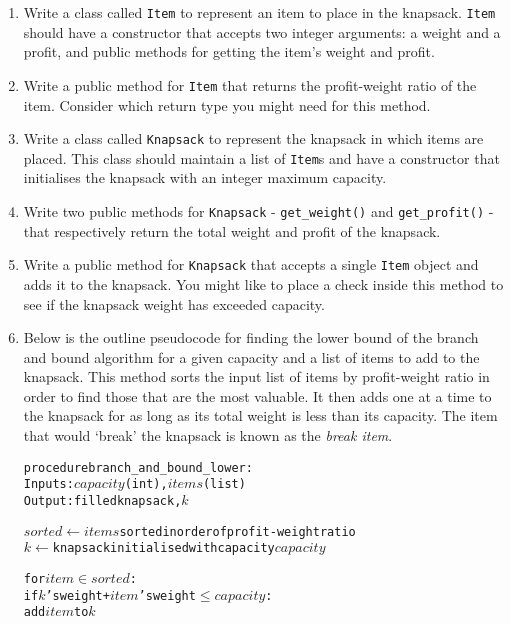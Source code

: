 \documentclass[11pt,a4paper]{report}
\begin{document}
\begin{enumerate}

    \item Write a class called \texttt{Item} to represent an item to place in the knapsack. \texttt{Item} should have a constructor that accepts two integer arguments: a weight and a profit, and public methods for getting the item's weight and profit.

    \item Write a public method for \texttt{Item} that returns the profit-weight ratio of the item. Consider which return type you might need for this method.

    \item Write a class called \texttt{Knapsack} to represent the knapsack in which items are placed. This class should maintain a list of \texttt{Item}s and have a constructor that initialises the knapsack with an integer maximum capacity.

    \item Write two public methods for \texttt{Knapsack} - \texttt{get\_weight()} and \texttt{get\_profit()} - that respectively return the total weight and profit of the knapsack.

    \item Write a public method for \texttt{Knapsack} that accepts a single \texttt{Item} object and adds it to the knapsack. You might like to place a check inside this method to see if the knapsack weight has exceeded capacity.

    \item Below is the outline pseudocode for finding the lower bound of the branch and bound algorithm for a given capacity and a list of items to add to the knapsack. This method sorts the input list of items by profit-weight ratio in order to find those that are the most valuable. It then adds one at a time to the knapsack for as long as its total weight is less than its capacity. The item that would `break' the knapsack is known as the \textit{break item}.
\begin{alltt}
procedure branch\_and\_bound\_lower:
    Inputs: \(capacity\) (int), \(items\) (list)
    Output: filled knapsack, \(k\)

    \(sorted \gets items\) sorted in order of profit-weight ratio
    \(k \gets\) knapsack initialised with capacity \(capacity\)
    
    for \(item \in sorted\):
        if \(k\)'s weight + \(item\)'s weight \(\leq capacity\):
            add \(item\) to \(k\)


\end{alltt}
\end{enumerate}
\end{document}
